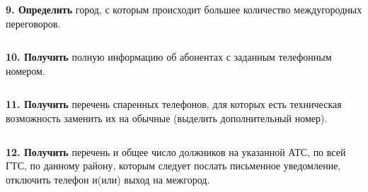 \documentclass{report}
\begin{document}
\begin{lstlisting}

\end{lstlisting}

\textbf{9. Определить} город, с которым происходит большее количество 
междугородных переговоров.

\begin{lstlisting}

\end{lstlisting}

\textbf{10. Получить} полную информацию об абонентах с заданным телефонным номером.

\begin{lstlisting}

\end{lstlisting}

\textbf{11. Получить} перечень спаренных телефонов, для которых есть 
техническая возможность заменить их на обычные (выделить дополнительный номер).

\begin{lstlisting}

\end{lstlisting}

\textbf{12. Получить} перечень и общее число должников на указанной АТС, 
по всей ГТС, по данному району, которым следует послать письменное уведомление, 
отключить телефон и(или) выход на межгород.

\begin{lstlisting}

\end{lstlisting}
\end{document}
